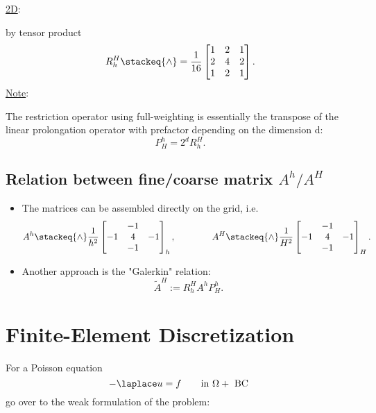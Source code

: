 \begin{itemize}
		\underline{2D}:

		by tensor product
		\[
			R_{h}^{H}\stackeq{\wedge}=\frac{1}{16}\begin{bmatrix}
				1 & 2 & 1 \\
				2 & 4 & 2 \\
				1 & 2 & 1
			\end{bmatrix}
		.\] 
		\underline{Note}:

		The restriction operator using full-weighting is essentially the transpose of the linear prolongation operator with prefactor depending on the dimension d:
		\[
			P_{H}^{h} = 2^{d}R_{h}^{H}
		.\] 
\end{itemize}

\subsection{Relation between fine/coarse matrix $A^{h} / A^{H}$}%
\label{sec:Relation between fine/coarse matrix $A^{h} / A^{H}$}

\begin{itemize}
	\item The matrices can be assembled directly on the grid, i.e.
		\[
			A^{h} \stackeq{\wedge} \frac{1}{h^{2}}\begin{bmatrix}
			& -1 & \\
				-1 & 4 & -1 \\
				   & -1 & 
			\end{bmatrix}_{h},
			\qquad\qquad
			A^{H} \stackeq{\wedge} \frac{1}{H^{2}}\begin{bmatrix}
			& -1 & \\
				-1 & 4 & -1 \\
				& -1 & 
			\end{bmatrix}_{H}
		.\] 

	\item Another approach is the "Galerkin" relation:
		\[
		\tilde{A}^{H}:=R_{h}^{H}A^{h}P_{H}^{h}
		.\] 
\end{itemize}

\section{Finite-Element Discretization}%
\label{sec:Finite-Element Discretization}


For a Poisson equation
\[
- \laplace u = f \qquad \text{in }\Omega + \text{ BC }
\] 
go over to the weak formulation of the problem:

